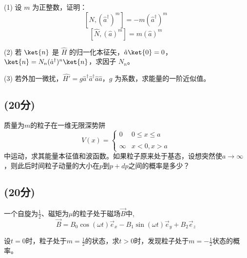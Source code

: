 (1) 设 $m$ 为正整数，证明：
$$[\hat{N}, (\hat{a}^\dagger)^m] = -m(\hat{a}^\dagger)^m~$$ 
$$[\hat{N}, (\hat{a})^m] = m(\hat{a})^m~$$

(2) 若 $\ket{n}$ 是 $\hat{H}$ 的归一化本征矢，$\hat{a}\ket{0} = 0$，$\ket{n} = N_n ( \hat{a}^\dagger )^n\ket{n}$，求因子 $N_n$。

(3) 若外加一微扰，$\hat{H'} = g\hat{a}^\dagger \hat{a}^\dagger \hat{a} \hat{a}$，$g$ 为系数，求能量的一阶近似值。
\subsection{(20分)}
 质量为$m$的粒子在一维无限深势阱
\[V(x) = \begin{cases} 0 & 0 \leq x \leq a \\\\\infty & x < 0, x > a \end{cases}~\]
中运动，求其能量本征值和波函数。如果粒子原来处于基态，设想突然使$a \to \infty$，则此后时间粒子动量的大小在$p$到$p + d p$之间的概率是多少？
\subsection{(20分)}
 一个自旋为$\frac{1}{2}$、磁矩为$\mu$的粒子处于磁场$\vec{B}$中,
\[
\vec{B} = B_0 \cos(\omega t) \vec{e}_x - B_1 \sin(\omega t) \vec{e}_y + B_2 \vec{e}_z~
\]

设$t = 0$时，粒子处于$m = \frac{1}{2}$的状态，求$t > 0$时，发现粒子处于$m= -\frac{1}{2}$状态的概率。



